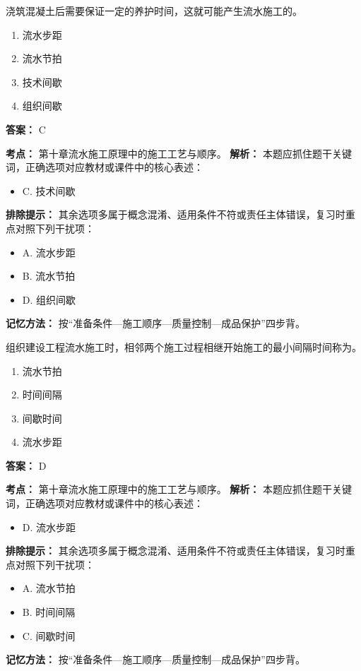 \documentclass[UTF8,fontset=fandol,11pt]{ctexart}
\begin{document}
\vspace{0.2em}

\begin{quizbox}[title={第 7 题}]
浇筑混凝土后需要保证一定的养护时间，这就可能产生流水施工的。\\
\begin{enumerate}[label=\Alph*.]
\item 流水步距
\item 流水节拍
\item 技术间歇
\item 组织间歇
\end{enumerate}
\textbf{答案：} C
\vspace{0.25em}
\begin{answerbox}[title={考点解析}]
\textbf{考点：} 第十章流水施工原理中的施工工艺与顺序。
\textbf{解析：} 本题应抓住题干关键词，正确选项对应教材或课件中的核心表述：
\begin{itemize}
\item C. 技术间歇
\end{itemize}
\textbf{排除提示：} 其余选项多属于概念混淆、适用条件不符或责任主体错误，复习时重点对照下列干扰项：
\begin{itemize}
\item A. 流水步距
\item B. 流水节拍
\item D. 组织间歇
\end{itemize}
\textbf{记忆方法：} 按“准备条件—施工顺序—质量控制—成品保护”四步背。
\end{answerbox}
\end{quizbox}

\vspace{0.2em}

\begin{quizbox}[title={第 8 题}]
组织建设工程流水施工时，相邻两个施工过程相继开始施工的最小间隔时间称为。\\
\begin{enumerate}[label=\Alph*.]
\item 流水节拍
\item 时间间隔
\item 间歇时间
\item 流水步距
\end{enumerate}
\textbf{答案：} D
\vspace{0.25em}
\begin{answerbox}[title={考点解析}]
\textbf{考点：} 第十章流水施工原理中的施工工艺与顺序。
\textbf{解析：} 本题应抓住题干关键词，正确选项对应教材或课件中的核心表述：
\begin{itemize}
\item D. 流水步距
\end{itemize}
\textbf{排除提示：} 其余选项多属于概念混淆、适用条件不符或责任主体错误，复习时重点对照下列干扰项：
\begin{itemize}
\item A. 流水节拍
\item B. 时间间隔
\item C. 间歇时间
\end{itemize}
\textbf{记忆方法：} 按“准备条件—施工顺序—质量控制—成品保护”四步背。
\end{answerbox}
\end{quizbox}
\end{document}
